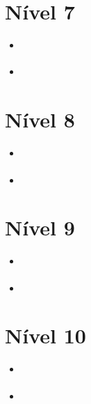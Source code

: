 \section{Nível 7}

\begin{itemize}
\item \url{}
\item \url{}
\end{itemize}



\section{Nível 8}


\begin{itemize}
\item \url{}
\item \url{}
\end{itemize}


\section{Nível 9}

\begin{itemize}
\item \url{}
\item \url{}
\end{itemize}



\section{Nível 10}

\begin{itemize}
\item \url{}
\item \url{}
\end{itemize}



